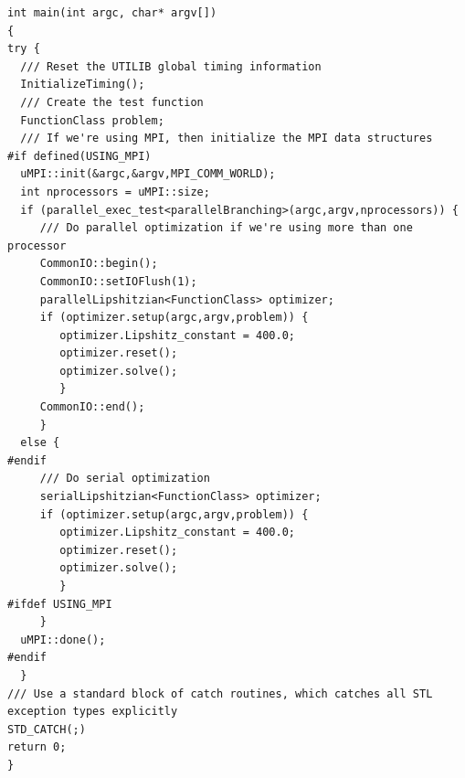 {\small
\begin{verbatim}
int main(int argc, char* argv[])
{
try {
  /// Reset the UTILIB global timing information
  InitializeTiming();
  /// Create the test function
  FunctionClass problem;
  /// If we're using MPI, then initialize the MPI data structures
#if defined(USING_MPI)
  uMPI::init(&argc,&argv,MPI_COMM_WORLD);
  int nprocessors = uMPI::size;
  if (parallel_exec_test<parallelBranching>(argc,argv,nprocessors)) {
     /// Do parallel optimization if we're using more than one processor
     CommonIO::begin();
     CommonIO::setIOFlush(1);
     parallelLipshitzian<FunctionClass> optimizer;
     if (optimizer.setup(argc,argv,problem)) {
        optimizer.Lipshitz_constant = 400.0;
        optimizer.reset();
        optimizer.solve();
        }
     CommonIO::end();
     }
  else {
#endif
     /// Do serial optimization
     serialLipshitzian<FunctionClass> optimizer;
     if (optimizer.setup(argc,argv,problem)) {
        optimizer.Lipshitz_constant = 400.0;
        optimizer.reset();
        optimizer.solve();
        }
#ifdef USING_MPI
     }
  uMPI::done();
#endif
  }
/// Use a standard block of catch routines, which catches all STL exception types explicitly
STD_CATCH(;)
return 0;
}
\end{verbatim}
}
